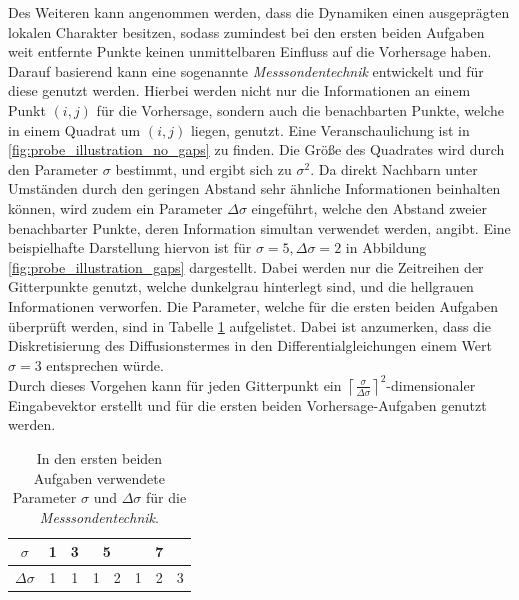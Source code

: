 Des Weiteren kann angenommen werden, dass die Dynamiken einen ausgeprägten lokalen Charakter besitzen, sodass zumindest bei den ersten beiden Aufgaben weit entfernte Punkte keinen unmittelbaren Einfluss auf die Vorhersage haben. Darauf basierend kann eine sogenannte \textit{Messsondentechnik} entwickelt und für diese genutzt werden. Hierbei werden nicht nur die Informationen an einem Punkt $(i, j)$ für die Vorhersage, sondern auch die benachbarten Punkte, welche in einem Quadrat um $(i, j)$ liegen, genutzt. Eine Veranschaulichung ist in \ref{fig:probe_illustration_no_gaps} zu finden. Die Größe des Quadrates wird durch den Parameter $\sigma$ bestimmt, und ergibt sich zu $\sigma^2$. Da direkt Nachbarn unter Umständen durch den geringen Abstand sehr ähnliche Informationen beinhalten können, wird zudem ein Parameter $\Delta \sigma$ eingeführt, welche den Abstand zweier benachbarter Punkte, deren Information simultan verwendet werden, angibt. Eine beispielhafte Darstellung hiervon ist für $\sigma = 5, \Delta \sigma=2$ in Abbildung \ref{fig:probe_illustration_gaps} dargestellt. Dabei werden nur die Zeitreihen der Gitterpunkte genutzt, welche dunkelgrau hinterlegt sind, und die hellgrauen Informationen verworfen. Die Parameter, welche für die ersten beiden Aufgaben überprüft werden, sind in Tabelle \ref{tab:probe_sigma_values} aufgelistet. Dabei ist anzumerken, dass die Diskretisierung des Diffusionstermes in den Differentialgleichungen einem Wert $\sigma=3$ entsprechen würde.\\
Durch dieses Vorgehen kann für jeden Gitterpunkt ein ${\left \lceil{\frac{\sigma}{\Delta \sigma}}\right \rceil}^2$-dimensionaler Eingabevektor erstellt und für die ersten beiden Vorhersage-Aufgaben genutzt werden.\\

\begin{table}[h]
\centering
\begin{tabular}{c||c|c|c|c|c|c|c|}
$\sigma$ & 1 & 3 & \multicolumn{2}{c|}{5} & \multicolumn{3}{c|}{7} \\
\hline
$\Delta \sigma$ & 1 & 1 & 1 & 2 & 1 & 2 & 3 \\
\end{tabular} 
\caption{In den ersten beiden Aufgaben verwendete Parameter $\sigma$ und $\Delta \sigma$ für die \textit{Messsondentechnik}.}
\label{tab:probe_sigma_values}
\end{table} 

